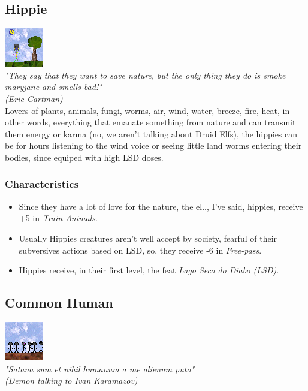 \documentclass[ letterpaper,12pt]{article}
\begin{document}
\subsection{Hippie}
\includegraphics{../data/races/Img/hippie.png}\\
{\it "They say that they want to save nature, but the only thing they do is smoke maryjane and smells bad!"\\ (Eric Cartman)}\\

Lovers of plants, animals, fungi, worms, air, wind, water, breeze, fire, heat,
in other words, everything that emanate something from nature and can transmit
them energy or karma (no, we aren't talking about Druid Elfs), the hippies can
be for hours listening to the wind voice or seeing little land worms entering
their bodies, since equiped with high LSD doses.\\

\subsubsection{Characteristics}
\begin{itemize}
\item{Since they have a lot of love for the nature, the el.., I've said, hippies, receive +5 in {\it Train Animals}.}
\item{Usually Hippies creatures aren't well accept by society, fearful of their subversives actions based on LSD, so, they receive -6 in {\it Free-pass}.}
\item{Hippies receive, in their first level, the feat {\it Lago Seco do Diabo (LSD)}.}
\end{itemize}

\subsection{Common Human}
\includegraphics{../data/races/Img/humano.png}\\
{\it "Satana sum et nihil humanum a me alienum puto"\\
 (Demon talking to Ivan Karamazov)}\\
\end{document}
